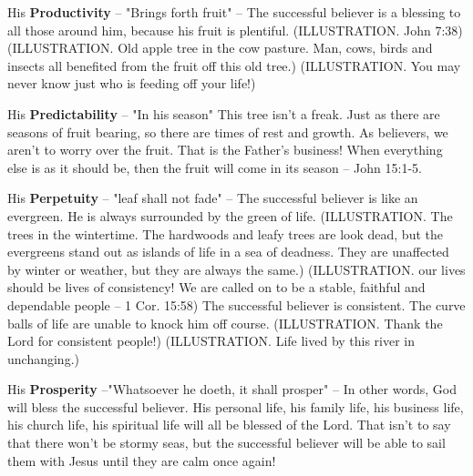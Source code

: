 \begin{compactenum}[I.][8]
\begin{compactenum}[A.]
		\item His \textbf{Productivity} – "Brings forth fruit" – The successful believer is a blessing to all those around him, because his fruit is plentiful. (ILLUSTRATION. John 7:38) (ILLUSTRATION. Old apple tree in the cow pasture. Man, cows, birds and insects all benefited from the fruit off this old tree.) (ILLUSTRATION. You may never know just who is feeding off your life!)
		\item His \textbf{Predictability} – "In his season" This tree isn’t a freak. Just as there are seasons of fruit bearing, so there are times of rest and growth. As believers, we aren’t to worry over the fruit. That is the Father’s business! When everything else is as it should be, then the fruit will come in its season – John 15:1-5.
		\item His \textbf{Perpetuity} – "leaf shall not fade" – The successful believer is like an evergreen. He is always surrounded by the green of life. (ILLUSTRATION. The trees in the wintertime. The hardwoods and leafy trees are look dead, but the evergreens stand out as islands of life in a sea of deadness. They are unaffected by winter or weather, but they are always the same.) (ILLUSTRATION. our lives should be lives of consistency! We are called on to be a stable, faithful and dependable people – 1 Cor. 15:58) The successful believer is consistent. The curve balls of life are unable to knock him off course. (ILLUSTRATION. Thank the Lord for consistent people!) (ILLUSTRATION. Life lived by this river in unchanging.)
		\item His \textbf{Prosperity} –"Whatsoever he doeth, it shall prosper" – In other words, God will bless the successful believer. His personal life, his family life, his business life, his church life, his spiritual life will all be blessed of the Lord. That isn’t to say that there won’t be stormy seas, but the successful believer will be able to sail them with Jesus until they are calm once again!
	\end{compactenum}
\end{compactenum}


